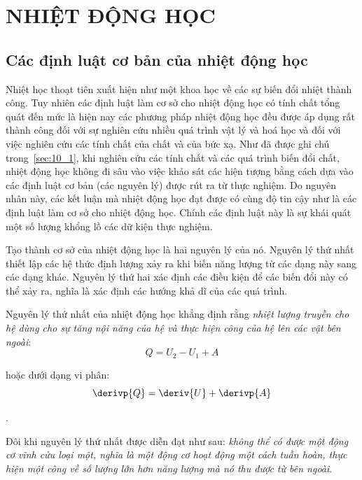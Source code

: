 

\chapter{NHIỆT ĐỘNG HỌC}\label{chap:12}

\section{Các định luật cơ bản của nhiệt động học}\label{sec:12_1}

Nhiệt học thoạt tiên xuất hiện như một khoa học về các sự biến đổi nhiệt thành công. Tuy nhiên các định luật làm cơ sở cho nhiệt động học có tính chất tổng quát đến mức là hiện nay các phương pháp nhiệt động học đều được áp dụng rất thành công đối với sự nghiên cứu nhiều quá trình vật lý và hoá học và đối với việc nghiên cứu các tính chất của chất và của bức xạ. Như đã được ghi chú trong~\ref{sec:10_1}, khi nghiên cứu các tính chất và các quá trình biến đổi chất, nhiệt động học không đi sâu vào việc khảo sát các hiện tượng bằng cách dựa vào các định luật cơ bản (các nguyên lý) được rút ra từ thực nghiệm. Do nguyên nhân này, các kết luận mà nhiệt động học đạt được có cùng độ tin cậy như là các định luật làm cơ sở cho nhiệt động học. Chính các định luật này là sự khái quát một số lượng khổng lồ các dữ kiện thực nghiệm.

Tạo thành cơ sở của nhiệt động học là hai nguyên lý của nó. Nguyên lý thứ nhất thiết lập các hệ thức định lượng xảy ra khi biến năng lượng từ các dạng này sang các dạng khác. Nguyên lý thứ hai xác định các điều kiện để các biến đổi này có thể xảy ra, nghĩa là xác định các hướng khả dĩ của các quá trình.

Nguyên lý thứ nhất của nhiệt động học khẳng định rằng \textit{nhiệt lượng truyền cho hệ dùng cho sự tăng nội năng của hệ và thực hiện công của hệ lên các vật bên ngoài}:
\begin{equation}\label{eq:12_1}
	Q = U_2 - U_1 + A
\end{equation}

\noindent
hoặc dưới dạng vi phân:
\begin{equation}\label{eq:12_2}
	\derivp{Q} = \deriv{U} + \derivp{A}
\end{equation}

.

Đôi khi nguyên lý thứ nhất được diễn đạt như sau: \textit{không thể có được một động cơ vĩnh cửu loại một, nghĩa là một động cơ hoạt động một cách tuần hoàn, thực hiện một công về số lượng lớn hơn năng lượng mà nó thu được từ bên ngoài}.


